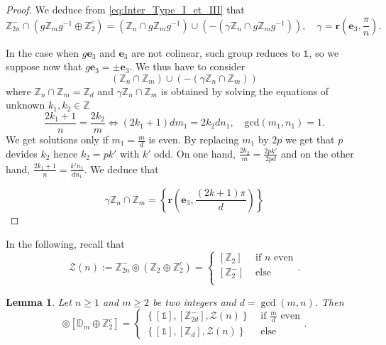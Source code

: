 \documentclass[11pt,a4paper]{amsart}
\newtheorem{lem}[thm]{Lemma}
\theoremstyle{definition}
\newcommand{\ZZ}{\mathbb{Z}}                %
\newcommand{\DD}{\mathbb{D}}                %
\newcommand{\1}{\mathds{1}}		            %
\newcommand{\ee}{\pmb{e}}                   %
\newcommand{\vR}{\mathbf{r}}
\newcommand{\set}[1]{\left\{#1\right\}}     %
\begin{document}
\begin{proof}
  We deduce from \eqref{eq:Inter_Type_I_et_III} that
  \begin{equation*}
    \ZZ_{2n}^- \cap (g\ZZ_m g^{-1}\oplus \ZZ_2^c)=(\ZZ_n\cap g \ZZ_m g^{-1})\cup (-(\gamma\ZZ_n\cap g \ZZ_m g^{-1})),\quad \gamma=\vR\left(\ee_3,\frac{\pi}{n}\right).
  \end{equation*}

  In the case when $g\ee_3$ and $\ee_3$ are not colinear, such group reduces to $\1$, so we suppose now that $g\ee_3=\pm \ee_3$. We thus have to consider
  \begin{equation*}
    (\ZZ_n\cap \ZZ_m )\cup (-(\gamma\ZZ_n\cap \ZZ_m))
  \end{equation*}
  where $\ZZ_n\cap \ZZ_m=\ZZ_d$ and $\gamma\ZZ_n\cap \ZZ_m$ is obtained by solving the equations of unknown $k_1,k_2\in \ZZ$
  \begin{equation*}
    \frac{2k_1+1}{n}=\frac{2k_2}{m} \iff (2k_1+1)d m_1=2k_2d n_1,\quad \mathrm{gcd}(m_1,n_1)=1.
  \end{equation*}
  We get solutions only if $m_1=\frac{m}{d}$ is even. By replacing $m_1$ by $2p$ we get that $p$ devides $k_2$ hence $k_2=p k'$ with $k'$ odd.
  On one hand, $\frac{2k_2}{m}=\frac{2p k'}{2pd}$ and on the other hand, $\frac{2k_1+1}{n}=\frac{k' n_1 }{dn_1}$. We deduce that

  \begin{equation*}
    \gamma\ZZ_n\cap \ZZ_m=\set{\vR\left(\ee_3,\frac{(2k+1)\pi}{d}\right)}
  \end{equation*}
\end{proof}

In the following, recall that
\begin{equation}\label{eq:Def_Zn}
  \mathcal{Z}(n):=\ZZ_{2n}^{-}\circledcirc (\ZZ_2\oplus \ZZ_2^c)= \begin{cases}
    [\ZZ_{2}]   & \text{ if } n \text{ even} \\
    [\ZZ_{2}^-] & \text{ else}               \\
  \end{cases}.
\end{equation}

\begin{lem}\label{lem:Z2nmoinsclipsDm}
  Let $n\geq 1$ and $m\geq 2$ be two integers and $d=\gcd(m,n)$. Then
  \begin{equation*}
    [\ZZ_{2n}^{-}] \circledcirc [\DD_m \oplus \ZZ_2^c]=
    \begin{cases}
      \set{[\1],[\ZZ_{2d}^-],\mathcal{Z}(n)} & \text{ if $\frac{m}{d}$ even} \\
      \set{[\1],[\ZZ_d],\mathcal{Z}(n)}      & \text{ else}
    \end{cases}		.
  \end{equation*}
\end{lem}
\end{document}
